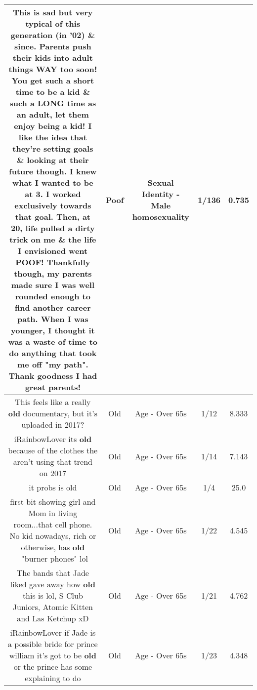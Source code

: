 \documentclass[11pt]{article}
\newlength\mylength
\begin{document}
\begin{center}
\begin{longtable}{|C{.65\mylength}|C{.30\mylength}|C{.12\mylength}|C{.12\mylength}|C{.12\mylength}|}
  \small This is sad but very typical of this generation (in '02) \& since. Parents push their kids into adult things WAY too soon! You get such a short time to be a kid \& such a LONG time as an adult, let them enjoy being a kid! I like the idea that they're setting goals \& looking at their future though. I knew what I wanted to be at 3. I worked exclusively towards that goal. Then, at 20, life pulled a dirty trick on me \& the life I envisioned went \textbf{POOF}! Thankfully though, my parents made sure I was well rounded enough to find another career path. When I was younger, I thought it was a waste of time to do anything that took me off "my path". Thank goodness I had great parents!\normalsize   & Poof & Sexual Identity - Male homosexuality & 1/136 & 0.735 \\  \hline
  \small This feels like a really \textbf{old} documentary, but it's uploaded in 2017?\normalsize   & Old & Age - Over 65s & 1/12 & 8.333 \\  \hline
  \small iRainbowLover its \textbf{old} because of the clothes the aren't using that trend on 2017\normalsize   & Old & Age - Over 65s & 1/14 & 7.143 \\  \hline
  \small it probs is old\normalsize   & Old & Age - Over 65s & 1/4 & 25.0 \\  \hline
  \small first bit showing girl and Mom in living room...that cell phone. No kid nowadays, rich or otherwise, has \textbf{old}  "burner phones" lol\normalsize   & Old & Age - Over 65s & 1/22 & 4.545 \\  \hline
  \small The bands that Jade liked gave away how \textbf{old} this is lol, S Club Juniors, Atomic Kitten and Las Ketchup xD\normalsize   & Old & Age - Over 65s & 1/21 & 4.762 \\  \hline
  \small iRainbowLover if Jade is a possible bride for prince william it's got to be \textbf{old} or the prince has some explaining to do\normalsize   & Old & Age - Over 65s & 1/23 & 4.348 \\  \hline

\end{longtable}
\end{center}
\end{document}
